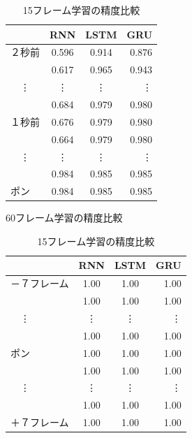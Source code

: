 \begin{table}[h]
       \hspace{0.1\textwidth}%
       \begin{subtable}{0.3\textwidth}
           \centering
           \begin{tabular}{l||c|c|r}
              & RNN & LSTM & GRU \\ \hline\hline
              ２秒前 & 0.596 & 0.914 & 0.876 \\ \hline
               & 0.617 & 0.965 & 0.943 \\ \hline
              　\vdots & \vdots & \vdots & \vdots \\ \hline
               & 0.684 & 0.979 & 0.980 \\ \hline
              １秒前 & 0.676 & 0.979 & 0.980 \\ \hline
               & 0.664 & 0.979 & 0.980 \\ \hline
              　\vdots & \vdots & \vdots & \vdots \\ \hline
               & 0.984 & 0.985 & 0.985 \\ \hline
              ポン & 0.984 & 0.985 & 0.985 \\ \hline
           \end{tabular}
           \caption{60フレーム学習の精度比較}
           \label{tb:60frame}
       \end{subtable}%
       \hspace{0.1\textwidth}%
       \begin{subtable}{0.3\textwidth}
           \centering
           \begin{tabular}{l||c|c|r}
              & RNN & LSTM & GRU \\ \hline\hline
              －７フレーム & 1.00 & 1.00 & 1.00 \\ \hline
               & 1.00 & 1.00 & 1.00 \\ \hline
              　\vdots & \vdots & \vdots & \vdots \\ \hline
               & 1.00 & 1.00 & 1.00 \\ \hline
              ポン & 1.00 & 1.00 & 1.00 \\ \hline
               & 1.00 & 1.00 & 1.00 \\ \hline
              　\vdots & \vdots & \vdots & \vdots \\ \hline
               & 1.00 & 1.00 & 1.00 \\ \hline
               ＋７フレーム& 1.00 & 1.00 & 1.00 \\ \hline
           \end{tabular}
           \caption{15フレーム学習の精度比較}
           \label{tb:15frame}
       \end{subtable}%
   \end{table}

